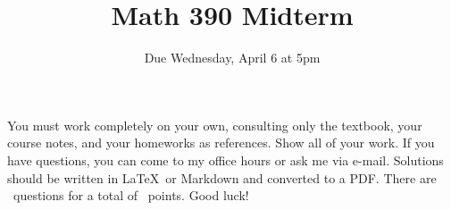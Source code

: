 \documentclass{exam}
\title{Math 390 Midterm}
\author{Due Wednesday, April 6 at 5pm}
\date{}
\begin{document}

\maketitle

\setlength{\parindent}{0em} %
\setlength{\parskip}{1em} %


You must work completely on your own, consulting only the textbook, your course notes, and your homeworks as references. Show all of your work. If you have questions, you can come to my office hours or ask me via e-mail. Solutions should be written in \LaTeX\ or Markdown and converted to a PDF. There are \numquestions\ questions for a total of \numpoints\ points. Good luck!
\end{document}
